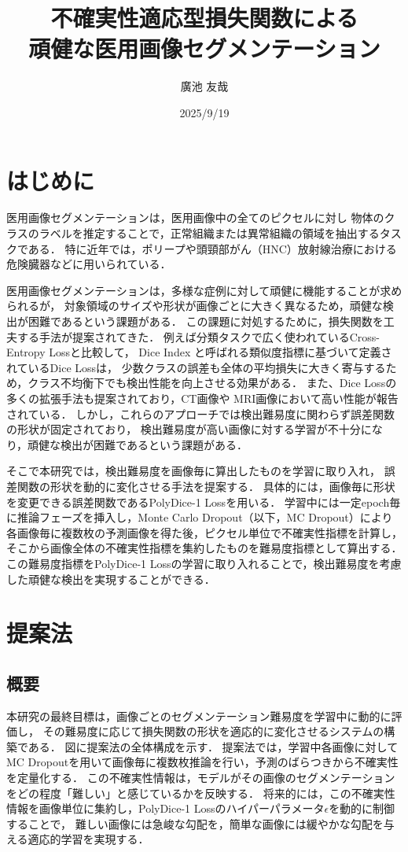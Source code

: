 \documentclass[10pt, a4paper, twocolumn]{jarticle}
\title{不確実性適応型損失関数による \\
頑健な医用画像セグメンテーション}
\author{廣池 友哉}
\affiliation{広島大学 大学院先進理工系科学研究科 情報科学プログラム}
\date{2025/9/19}
\begin{document}
\maketitle


\section{はじめに}
医用画像セグメンテーションは，医用画像中の全てのピクセルに対し
物体のクラスのラベルを推定することで，正常組織または異常組織の領域を抽出するタスクである．
特に近年では，ポリープ\cite{ji2022video}や頭頸部がん（HNC）放射線治療における危険臓器\cite{maleki2020machine}などに用いられている．

医用画像セグメンテーションは，多様な症例に対して頑健に機能することが求められるが，
対象領域のサイズや形状が画像ごとに大きく異なるため，頑健な検出が困難であるという課題がある．
この課題に対処するために，損失関数を工夫する手法が提案されてきた．
例えば分類タスクで広く使われているCross-Entropy Loss\cite{long2015fully}と比較して，
Dice Index と呼ばれる類似度指標に基づいて定義されているDice Loss\cite{milletari2016v}は，
少数クラスの誤差も全体の平均損失に大きく寄与するため，クラス不均衡下でも検出性能を向上させる効果がある．
また、Dice Lossの多くの拡張手法も提案されており，CT画像\cite{zhu2019anatomynet, 9109297}や
MRI画像\cite{KATO2024107695}において高い性能が報告されている．
しかし，これらのアプローチでは検出難易度に関わらず誤差関数の形状が固定されており，
検出難易度が高い画像に対する学習が不十分になり，頑健な検出が困難であるという課題がある．

そこで本研究では，検出難易度を画像毎に算出したものを学習に取り入れ，
誤差関数の形状を動的に変化させる手法を提案する．
具体的には，画像毎に形状を変更できる誤差関数であるPolyDice-1 Lossを用いる．
学習中には一定epoch毎に推論フェーズを挿入し，Monte Carlo Dropout\cite{pmlr-v48-gal16}（以下，MC Dropout）により
各画像毎に複数枚の予測画像を得た後，ピクセル単位で不確実性指標を計算し，そこから画像全体の不確実性指標を集約したものを難易度指標として算出する．
この難易度指標をPolyDice-1 Lossの学習に取り入れることで，検出難易度を考慮した頑健な検出を実現することができる．

\section{提案法}

\subsection{概要}
本研究の最終目標は，画像ごとのセグメンテーション難易度を学習中に動的に評価し，
その難易度に応じて損失関数の形状を適応的に変化させるシステムの構築である．
図に提案法の全体構成を示す．
提案法では，学習中各画像に対してMC Dropoutを用いて画像毎に複数枚推論を行い，予測のばらつきから不確実性を定量化する．
この不確実性情報は，モデルがその画像のセグメンテーションをどの程度「難しい」と感じているかを反映する．
将来的には，この不確実性情報を画像単位に集約し，PolyDice-1 Lossのハイパーパラメータ$\epsilon$を動的に制御することで，
難しい画像には急峻な勾配を，簡単な画像には緩やかな勾配を与える適応的学習を実現する．
\end{document}
